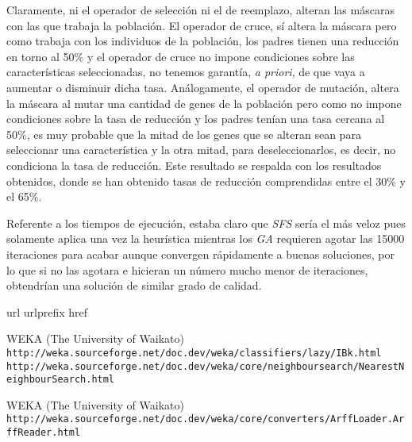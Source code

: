 \documentclass[a4paper, 11pt]{article}
\begin{document}
			Claramente, ni el operador de selección ni el de reemplazo, alteran las máscaras con las
			que trabaja la población. El operador de cruce, sí altera la máscara pero como trabaja con
			los individuos de la población, los padres tienen una reducción en torno al 50\% y el
			operador de cruce no impone condiciones sobre las características seleccionadas, no tenemos
			garantía, \textit{a priori}, de que vaya a aumentar o disminuir dicha tasa. Análogamente,
			el operador de mutación, altera la máscara al mutar una cantidad de genes de la población
			pero como no impone condiciones sobre la tasa de reducción y los padres tenían una tasa
			cercana al 50\%, es muy probable que la mitad de los genes que se alteran sean para seleccionar
			una característica y la otra mitad, para deseleccionarlos, es decir, no condiciona la tasa
			de reducción. Este resultado se respalda con los resultados obtenidos, donde se han obtenido
			tasas de reducción comprendidas entre el 30\% y el 65\%.
			
			Referente a los tiempos de ejecución, estaba claro que \textit{SFS} sería el más veloz pues
			solamente aplica una vez la heurística mientras los \textit{GA} requieren agotar las 15000
			iteraciones para acabar aunque convergen rápidamente a buenas soluciones, por lo que si no
			las agotara e hicieran un número mucho menor de iteraciones, obtendrían una solución de
			similar grado de calidad.
		
	
	\newpage
	
	\begin{thebibliography}{10}
	\expandafter\ifx\csname url\endcsname\relax
	  \def\url#1{\texttt{#1}}\fi
	\expandafter\ifx\csname urlprefix\endcsname\relax\def\urlprefix{URL }\fi
	\expandafter\ifx\csname href\endcsname\relax
	  \def\href#1#2{#2} \def\path#1{#1}\fi
	
	WEKA (The University of Waikato)\\
	  \url{http://weka.sourceforge.net/doc.dev/weka/classifiers/lazy/IBk.html}\\
	  \url{http://weka.sourceforge.net/doc.dev/weka/core/neighboursearch/NearestNeighbourSearch.html}
	  
  	WEKA (The University of Waikato)\\
	  \url{http://weka.sourceforge.net/doc.dev/weka/core/converters/ArffLoader.ArffReader.html}
	  
	\end{thebibliography}
\end{document}
